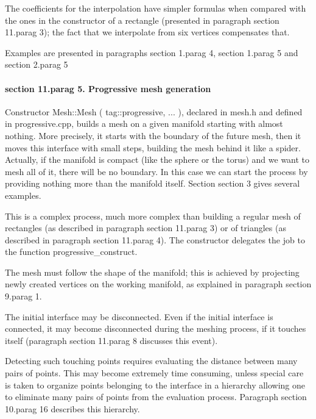 The coefficients for the interpolation have simpler formulas when compared with the ones in the
constructor of a rectangle (presented in paragraph \numb section 11.\numb parag 3);
the fact that we interpolate from six vertices compensates that.

Examples are presented in paragraphs \numb section 1.\numb parag 4, \numb section 1.\numb parag 5
and \numb section 2.\numb parag 5


\paragraph{\numb section 11.\numb parag 5. Progressive mesh generation}

Constructor {\codett Mesh::Mesh ( tag::progressive, ... )}, declared in {\codett mesh.h} and defined
in {\codett progressive.cpp}, builds a mesh on a given manifold starting with almost nothing.
More precisely, it starts with the boundary of the future mesh, then it
moves this interface with small steps, building the mesh behind it like a spider.
Actually, if the manifold is compact (like the sphere or the torus) and we want to mesh all of it,
there will be no boundary.
In this case we can start the process by providing nothing more than the manifold itself.
Section \numb section 3 gives several examples.

This is a complex process, much more complex than building a regular mesh of rectangles
(as described in paragraph \numb section 11.\numb parag 3) or of triangles (as described
in paragraph \numb section 11.\numb parag 4).
The constructor delegates the job to the function {\codett progressive\_construct}.

The mesh must follow the shape of the manifold; this is achieved by {\codett project}ing
newly created vertices on the working manifold, as explained in paragraph
\numb section 9.\numb parag 1.

The initial interface may be disconnected.
Even if the initial interface is connected, it may become disconnected during the meshing
process, if it touches itself (paragraph \numb section 11.\numb parag 8 discusses this event).

Detecting such touching points requires evaluating the distance between many pairs of points.
This may become extremely time consuming, unless special care is taken to organize points
belonging to the interface in a hierarchy allowing one to eliminate many pairs of points
from the evaluation process.
Paragraph \numb section 10.\numb parag 16 describes this hierarchy.

